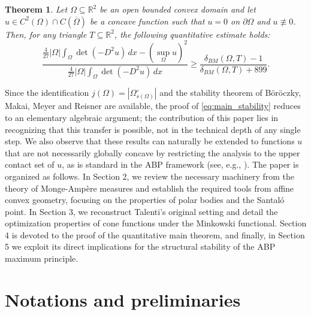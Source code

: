 \documentclass{article}
\newtheorem{theorem}{Theorem}[section]
\numberwithin{equation}{section}
\begin{document}
\begin{theorem}
Let $\Omega \subseteq \mathbb{R}^2$ be an open bounded convex domain and let $u \in C^2(\Omega)\cap C(\overline{\Omega})$ be a concave function such that $u=0$ on $\partial \Omega$ and $u \not\equiv 0$. Then, for any triangle $T \subseteq \mathbb{R}^2$, the following quantitative estimate holds:
\begin{equation}\label{eq:main_stability}
\frac{\frac{4}{27}|\Omega|\displaystyle\int_\Omega\det (-D^2u)\,dx - (\sup_\Omega u)^2}{\frac{4}{27}|\Omega|\displaystyle\int_\Omega\det (-D^2u)\,dx} \ge \frac{\delta_{BM}(\Omega, T)-1}{\delta_{BM}(\Omega,T)+899}.
\end{equation}
\end{theorem}

\noindent Since the identification $j(\Omega)=|\Omega^\circ_{s(\Omega)}|$ and the stability theorem of Böröczky, Makai, Meyer and Reisner are available, the proof of \eqref{eq:main_stability} reduces to an elementary algebraic argument; the contribution of this paper lies in recognizing that this transfer is possible, not in the technical depth of any single step.
We also observe that these results can naturally be extended to functions $u$ that are not necessarily globally concave by restricting the analysis to the upper contact set of $u$, as is standard in the ABP framework (see, e.g., \cite{gilbarg2001}).
\noindent The paper is organized as follows. In Section 2, we review the necessary machinery from the theory of Monge-Ampère measures and establish the required tools from affine convex geometry, focusing on the properties of polar bodies and the Santaló point. In Section 3, we reconstruct Talenti's original setting and detail the optimization properties of cone functions under the Minkowski functional. Section 4 is devoted to the proof of the quantitative main theorem, and finally, in Section 5 we exploit its direct implications for the structural stability of the ABP maximum principle.
\section{Notations and preliminaries}
\end{document}
